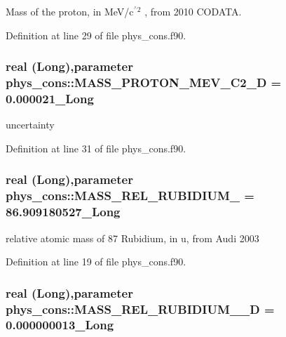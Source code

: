 Mass of the proton, in MeV/c$^{\mbox{$^\wedge$2}}$ , from 2010 CODATA. 



Definition at line 29 of file phys\_\-cons.f90.

\hypertarget{namespacephys__cons_a3299e2ce8c6c720ed740eff7968b27a8}{
\subsubsection[{MASS\_\-PROTON\_\-MEV\_\-C2\_\-D}]{\setlength{\rightskip}{0pt plus 5cm}real (Long),parameter {\bf phys\_\-cons::MASS\_\-PROTON\_\-MEV\_\-C2\_\-D} = 0.000021\_\-Long}}
\label{namespacephys__cons_a3299e2ce8c6c720ed740eff7968b27a8}


uncertainty 



Definition at line 31 of file phys\_\-cons.f90.

\hypertarget{namespacephys__cons_a41d46c36bfd57d8d6d1721791aa48ae2}{
\subsubsection[{MASS\_\-REL\_\-RUBIDIUM\_\-87}]{\setlength{\rightskip}{0pt plus 5cm}real (Long),parameter {\bf phys\_\-cons::MASS\_\-REL\_\-RUBIDIUM\_} = 86.909180527\_\-Long}}
\label{namespacephys__cons_a41d46c36bfd57d8d6d1721791aa48ae2}


relative atomic mass of 87 Rubidium, in u, from Audi 2003 



Definition at line 19 of file phys\_\-cons.f90.

\hypertarget{namespacephys__cons_afb707c156dff06d8cfcf41488ce7aeda}{
\subsubsection[{MASS\_\-REL\_\-RUBIDIUM\_\-87\_\-D}]{\setlength{\rightskip}{0pt plus 5cm}real (Long),parameter {\bf phys\_\-cons::MASS\_\-REL\_\-RUBIDIUM\_\_\-D} = 0.000000013\_\-Long}}
\label{namespacephys__cons_afb707c156dff06d8cfcf41488ce7aeda}



